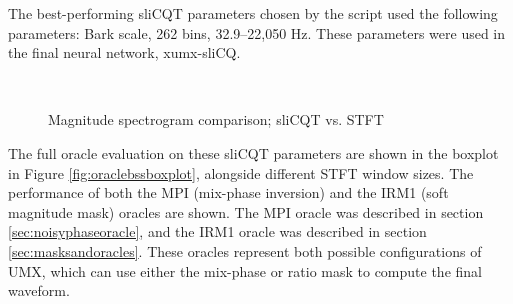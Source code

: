 \documentclass[report.tex]{subfiles}
\begin{document}
The best-performing sliCQT parameters chosen by the script used the following parameters: Bark scale, 262 bins, 32.9--22,050 Hz. These parameters were used in the final neural network, xumx-sliCQ.

\begin{figure}[ht]
	\centering
	\\
	\caption{Magnitude spectrogram comparison; sliCQT vs. STFT}
	\label{fig:bipolarslicqs}
\end{figure}

The full oracle evaluation on these sliCQT parameters are shown in the boxplot in Figure \ref{fig:oraclebssboxplot}, alongside different STFT window sizes. The performance of both the MPI (mix-phase inversion) and the IRM1 (soft magnitude mask) oracles are shown. The MPI oracle was described in section \ref{sec:noisyphaseoracle}, and the IRM1 oracle was described in section \ref{sec:masksandoracles}. These oracles represent both possible configurations of UMX, which can use either the mix-phase or ratio mask to compute the final waveform.
\end{document}
